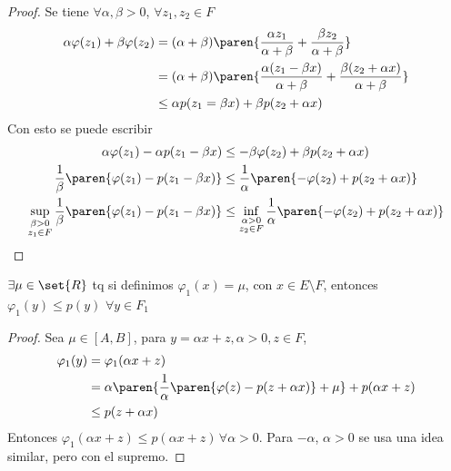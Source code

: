 \documentclass{notetaking}
\begin{document}
\begin{proof}
    Se tiene \(\forall\alpha,\beta>0\), \(\forall z_1,z_2\in F\)
    \begin{align*}
        \alpha\varphi(z_1)+\beta\varphi(z_2) &= (\alpha+\beta)\paren{\frac{\alpha z_1}{\alpha+\beta}+\frac{\beta z_2}{\alpha+\beta}}\\
        &= (\alpha+\beta)\paren{\frac{\alpha (z_1-\beta x)}{\alpha+\beta}+\frac{\beta (z_2+\alpha x)}{\alpha+\beta}}\\
        &\leq \alpha p(z_1=\beta x)+\beta p(z_2+\alpha x)
    \end{align*}
    Con esto se puede escribir
    \begin{align*}
        \alpha\varphi(z_1)-\alpha p(z_1-\beta x)&\leq-\beta\varphi(z_2)+\beta p(z_2+\alpha x)\\
        \frac1\beta\paren{\varphi(z_1)-p(z_1-\beta x)}&\leq\frac1\alpha\paren{-\varphi(z_2)+ p(z_2+\alpha x)}\\
        \sup_{\substack{\beta>0\\z_1\in F}}\frac1\beta\paren{\varphi(z_1)-p(z_1-\beta x)}&\leq\inf_{\substack{\alpha>0\\z_2\in F}}\frac1\alpha\paren{-\varphi(z_2)+ p(z_2+\alpha x)}
    \end{align*}
\end{proof}
\begin{cor}
    \(\exists\mu\in\set{R}\) tq si definimos \(\varphi_1(x)=\mu\), con \(x\in E\setminus F\), entonces \(\varphi_1(y)\leq p(y)\) \(\forall y\in F_1\)
\end{cor}
\begin{proof}
    Sea \(\mu\in[A,B]\), para \(y=\alpha x+z,\alpha>0,z\in F\),
    \begin{align*}
        \varphi_1(y)&=\varphi_1(\alpha x+z)\\
        &=\alpha\paren{\frac1\alpha\paren{\varphi(z)-p(z+\alpha x)}+\mu}+p(\alpha x+z)\\
        &\leq p(z+\alpha x)
    \end{align*}
    Entonces \(\varphi_1(\alpha x+z)\leq p(\alpha x+z)\, \forall \alpha>0\). Para \(-\alpha\), \(\alpha>0\) se usa una idea similar, pero con el supremo.
\end{proof}
\end{document}
